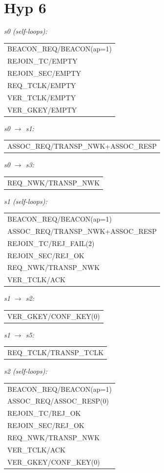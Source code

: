 \documentclass[10pt]{article}
\makeatletter
\newcommand{\iolist}[1]{%
  \ttfamily\small
  \begin{tabular}{@{}l@{}}
  #1
  \end{tabular}%
  \rmfamily
}
\makeatother
\begin{document}
\section*{Hyp 6}

\noindent\textit{s0 (self-loops):}\\[2pt]
\iolist{%
BEACON\_REQ/BEACON(ap=1)\\
REJOIN\_TC/EMPTY\\
REJOIN\_SEC/EMPTY\\
REQ\_TCLK/EMPTY\\
VER\_TCLK/EMPTY\\
VER\_GKEY/EMPTY\\
}

\medskip
\noindent\textit{s0 $\to$ s1:}\\[2pt]
\iolist{%
ASSOC\_REQ/TRANSP\_NWK+ASSOC\_RESP\\
}

\medskip
\noindent\textit{s0 $\to$ s3:}\\[2pt]
\iolist{%
REQ\_NWK/TRANSP\_NWK\\
}

\medskip
\noindent\textit{s1 (self-loops):}\\[2pt]
\iolist{%
BEACON\_REQ/BEACON(ap=1)\\
ASSOC\_REQ/TRANSP\_NWK+ASSOC\_RESP\\
REJOIN\_TC/REJ\_FAIL(2)\\
REJOIN\_SEC/REJ\_OK\\
REQ\_NWK/TRANSP\_NWK\\
VER\_TCLK/ACK\\
}

\medskip
\noindent\textit{s1 $\to$ s2:}\\[2pt]
\iolist{%
VER\_GKEY/CONF\_KEY(0)\\
}

\medskip
\noindent\textit{s1 $\to$ s5:}\\[2pt]
\iolist{%
REQ\_TCLK/TRANSP\_TCLK\\
}

\medskip
\noindent\textit{s2 (self-loops):}\\[2pt]
\iolist{%
BEACON\_REQ/BEACON(ap=1)\\
ASSOC\_REQ/ASSOC\_RESP(0)\\
REJOIN\_TC/REJ\_OK\\
REJOIN\_SEC/REJ\_OK\\
REQ\_NWK/TRANSP\_NWK\\
VER\_TCLK/ACK\\
VER\_GKEY/CONF\_KEY(0)\\
}
\end{document}
